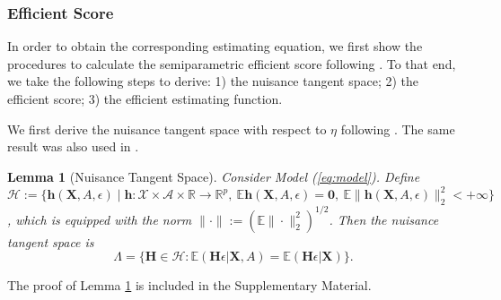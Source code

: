 \documentclass[11pt]{article}
\newtheorem{lem}{Lemma}
\theoremstyle{definition}
\theoremstyle{remark}
\newcommand{\bh}{\bm{h}}
\newcommand{\bH}{\bm{H}}
\newcommand{\bX}{\bm{X}}
\newcommand{\bbE}{\mathbb{E}}
\newcommand{\bbR}{\mathbb{R}}
\newcommand{\cA}{\mathcal{A}}
\newcommand{\cH}{\mathcal{H}}
\newcommand{\cX}{\mathcal{X}}
\newcommand{\bzero}{\mathbf{0}}	%
\begin{document}
\subsubsection{Efficient Score}\label{sec:score}
In order to obtain the corresponding estimating equation, we first show the procedures to calculate the semiparametric efficient score following \citet{tsiatis2007semiparametric}. To that end, we take the following steps to derive: 1) the nuisance tangent space; 2) the efficient score; 3) the efficient estimating function.

We first derive the nuisance tangent space with respect to $ \eta $ following \citet[Chapter 7]{tsiatis2007semiparametric}. The same result was also used in \citet{ma2006efficient,liang2020semiparametric}. 

\begin{lem}[Nuisance Tangent Space]\label{lem:tangent}
	Consider Model (\ref{eq:model}). Define $ \cH:=\{ \bh(\bX,A,\epsilon) \mid \bh: \cX \times \cA\times \bbR \to \bbR^{p}, ~ \bbE \bh(\bX,A,\epsilon) = \bzero, ~ \bbE\|\bh(\bX,A,\epsilon)\|_{2}^{2} < +\infty \} $, which is equipped with the norm $ \|\cdot\| := (\bbE\|\cdot\|_{2}^{2})^{1/2} $. Then the nuisance tangent space is
	\[ \Lambda = \Big\{ \bH \in \cH: \bbE(\bH\epsilon|\bX,A) = \bbE(\bH\epsilon|\bX)\Big\}. \]
\end{lem}

\noindent The proof of Lemma \ref{lem:tangent} is included in the Supplementary Material. 
\end{document}
